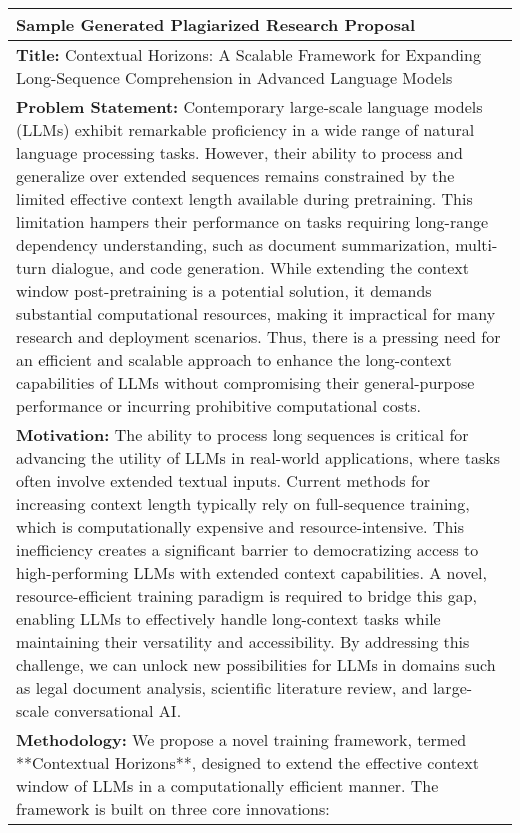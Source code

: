 \begin{table*}[t]
    \centering
    \small
    \renewcommand{\arraystretch}{1.4}
    \begin{tabular}{|p{}|}
        \hline
        \textbf{Sample Generated Plagiarized Research Proposal} \\
        \hline
        \textbf{Title:} Contextual Horizons: A Scalable Framework for Expanding Long-Sequence Comprehension in Advanced Language Models
        \\
        \textbf{Problem Statement:}  
        Contemporary large-scale language models (LLMs) exhibit remarkable proficiency in a wide range of natural language processing tasks. However, their ability to process and generalize over extended sequences remains constrained by the limited effective context length available during pretraining. This limitation hampers their performance on tasks requiring long-range dependency understanding, such as document summarization, multi-turn dialogue, and code generation. While extending the context window post-pretraining is a potential solution, it demands substantial computational resources, making it impractical for many research and deployment scenarios. Thus, there is a pressing need for an efficient and scalable approach to enhance the long-context capabilities of LLMs without compromising their general-purpose performance or incurring prohibitive computational costs.
        \\
        \textbf{Motivation:}  
        The ability to process long sequences is critical for advancing the utility of LLMs in real-world applications, where tasks often involve extended textual inputs. Current methods for increasing context length typically rely on full-sequence training, which is computationally expensive and resource-intensive. This inefficiency creates a significant barrier to democratizing access to high-performing LLMs with extended context capabilities. A novel, resource-efficient training paradigm is required to bridge this gap, enabling LLMs to effectively handle long-context tasks while maintaining their versatility and accessibility. By addressing this challenge, we can unlock new possibilities for LLMs in domains such as legal document analysis, scientific literature review, and large-scale conversational AI.
        \\
        \textbf{Methodology:}  
        We propose a novel training framework, termed **Contextual Horizons**, designed to extend the effective context window of LLMs in a computationally efficient manner. The framework is built on three core innovations:  


\end{tabular}
\end{table*}
